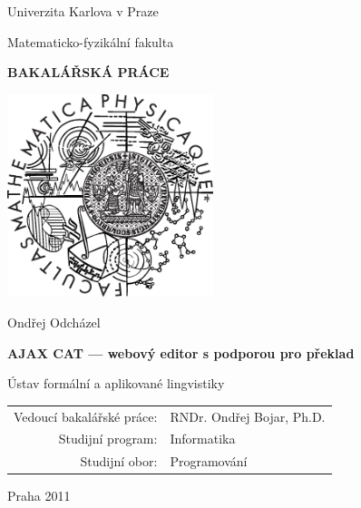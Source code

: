 \documentclass[12pt,a4paper]{report}
\begin{document}


\pagestyle{empty}
\begin{center}

\large

Univerzita Karlova v Praze

\medskip

Matematicko-fyzikální fakulta

\vfill

{\bf\Large BAKALÁŘSKÁ PRÁCE}

\vfill

\centerline{\mbox{\includegraphics[width=60mm]{logo.eps}}}

\vfill
\vspace{5mm}

{\LARGE Ondřej Odcházel}

\vspace{15mm}

{\LARGE\bfseries AJAX CAT --- webový editor s podporou pro překlad}

\vfill

Ústav formální a aplikované lingvistiky

\vfill

\begin{tabular}{rl}

Vedoucí bakalářské práce: & RNDr. Ondřej Bojar, Ph.D. \\
\noalign{\vspace{2mm}}
Studijní program: & Informatika \\
\noalign{\vspace{2mm}}
Studijní obor: & Programování \\
\end{tabular}

\vfill

Praha 2011

\end{center}
\end{document}
